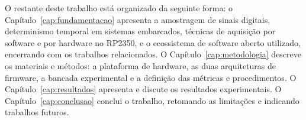O restante deste trabalho está organizado da seguinte forma: o
Capítulo~\ref{cap:fundamentacao} apresenta a amostragem de sinais digitais,
determinismo temporal em sistemas embarcados, técnicas de aquisição por
software e por hardware no RP2350, e o ecossistema de software aberto
utilizado, encerrando com os trabalhos relacionados. O
Capítulo~\ref{cap:metodologia} descreve os materiais e métodos: a
plataforma de hardware, as duas arquiteturas de firmware, a bancada
experimental e a definição das métricas e procedimentos. O
Capítulo~\ref{cap:resultados} apresenta e discute os resultados experimentais.
O Capítulo~\ref{cap:conclusao} conclui o trabalho, retomando as limitações e
indicando trabalhos futuros.
